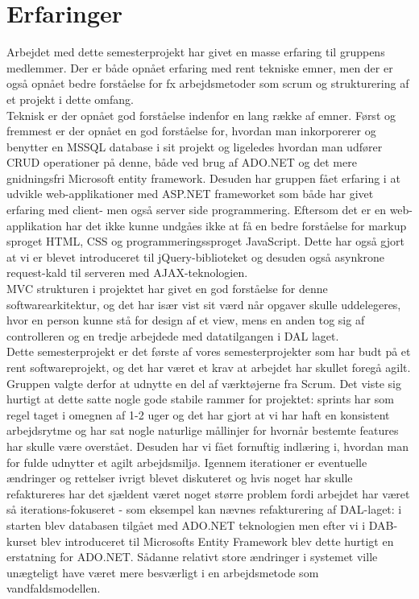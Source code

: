 \section{Erfaringer}
Arbejdet med dette semesterprojekt har givet en masse erfaring til gruppens medlemmer. Der er både opnået erfaring med rent tekniske emner, men der er også opnået bedre forståelse for fx arbejdsmetoder som scrum og strukturering af et projekt i dette omfang.\\
Teknisk er der opnået god forståelse indenfor en lang række af emner. Først og fremmest er der opnået en god forståelse for, hvordan man inkorporerer og benytter en MSSQL database i sit projekt og ligeledes hvordan man udfører CRUD operationer på denne, både ved brug af ADO.NET og det mere gnidningsfri Microsoft entity framework. Desuden har gruppen fået erfaring i at udvikle web-applikationer med ASP.NET frameworket som både har givet erfaring med client- men også server side programmering. Eftersom det er en web-applikation har det ikke kunne undgåes ikke at få en bedre forståelse for markup sproget HTML, CSS og programmeringssproget JavaScript. Dette har også gjort at vi er blevet introduceret til jQuery-biblioteket og desuden også asynkrone request-kald til serveren med AJAX-teknologien.\\
MVC strukturen i projektet har givet en god forståelse for denne softwarearkitektur, og det har især vist sit værd når opgaver skulle uddelegeres, hvor en person kunne stå for design af et view, mens en anden tog sig af controlleren og en tredje arbejdede med datatilgangen i DAL laget. 
\\
Dette semesterprojekt er det første af vores semesterprojekter som har budt på et rent softwareprojekt, og det har været et krav at arbejdet har skullet foregå agilt. Gruppen valgte derfor at udnytte en del af værktøjerne fra Scrum. Det viste sig hurtigt at dette satte nogle gode stabile rammer for projektet: sprints har som regel taget i omegnen af 1-2 uger og det har gjort at vi har haft en konsistent arbejdsrytme og har sat nogle naturlige mållinjer for hvornår bestemte features har skulle være overstået. Desuden har vi fået fornuftig indlæring i, hvordan man for fulde udnytter et agilt arbejdsmiljø. Igennem iterationer er eventuelle ændringer og rettelser ivrigt blevet diskuteret og hvis noget har skulle refaktureres har det sjældent været noget større problem fordi arbejdet har været så iterations-fokuseret - som eksempel kan nævnes refakturering af DAL-laget: i starten blev databasen tilgået med ADO.NET teknologien men efter vi i DAB-kurset blev introduceret til Microsofts Entity Framework blev dette hurtigt en erstatning for ADO.NET. Sådanne relativt store ændringer i systemet ville unægteligt have været mere besværligt i en arbejdsmetode som vandfaldsmodellen. \\

